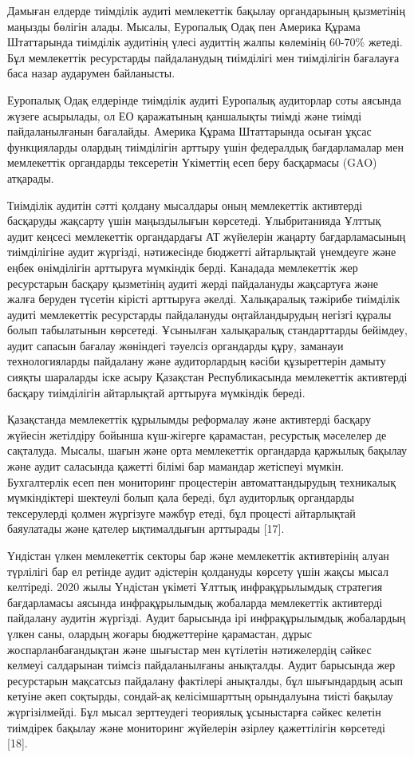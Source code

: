 \begin{multicols}{2}
Дамыған елдерде тиімділік аудиті мемлекеттік бақылау органдарының
қызметінің маңызды бөлігін алады. Мысалы, Еуропалық Одақ пен Америка
Құрама Штаттарында тиімділік аудитінің үлесі аудиттің жалпы көлемінің
60-70\% жетеді. Бұл мемлекеттік ресурстарды пайдаланудың тиімділігі мен
тиімділігін бағалауға баса назар аударумен байланысты.

Еуропалық Одақ елдерінде тиімділік аудиті Еуропалық аудиторлар соты
аясында жүзеге асырылады, ол ЕО қаражатының қаншалықты тиімді және
тиімді пайдаланылғанын бағалайды. Америка Құрама Штаттарында осыған
ұқсас функцияларды олардың тиімділігін арттыру үшін федералдық
бағдарламалар мен мемлекеттік органдарды тексеретін Үкіметтің есеп беру
басқармасы (GAO) атқарады.

Тиімділік аудитін сәтті қолдану мысалдары оның мемлекеттік активтерді
басқаруды жақсарту үшін маңыздылығын көрсетеді. Ұлыбританияда Ұлттық
аудит кеңсесі мемлекеттік органдардағы АТ жүйелерін жаңарту
бағдарламасының тиімділігіне аудит жүргізді, нәтижесінде бюджетті
айтарлықтай үнемдеуге және еңбек өнімділігін арттыруға мүмкіндік берді.
Канадада мемлекеттік жер ресурстарын басқару қызметінің аудиті жерді
пайдалануды жақсартуға және жалға беруден түсетін кірісті арттыруға
әкелді. Халықаралық тәжірибе тиімділік аудиті мемлекеттік ресурстарды
пайдалануды оңтайландырудың негізгі құралы болып табылатынын көрсетеді.
Ұсынылған халықаралық стандарттарды бейімдеу, аудит сапасын бағалау
жөніндегі тәуелсіз органдарды құру, заманауи технологияларды пайдалану
және аудиторлардың кәсіби құзыреттерін дамыту сияқты шараларды іске
асыру Қазақстан Республикасында мемлекеттік активтерді басқару
тиімділігін айтарлықтай арттыруға мүмкіндік береді.

Қазақстанда мемлекеттік құрылымды реформалау және активтерді басқару
жүйесін жетілдіру бойынша күш-жігерге қарамастан, ресурстық мәселелер де
сақталуда. Мысалы, шағын және орта мемлекеттік органдарда қаржылық
бақылау және аудит саласында қажетті білімі бар мамандар жетіспеуі
мүмкін. Бухгалтерлік есеп пен мониторинг процестерін автоматтандырудың
техникалық мүмкіндіктері шектеулі болып қала береді, бұл аудиторлық
органдарды тексерулерді қолмен жүргізуге мәжбүр етеді, бұл процесті
айтарлықтай баяулатады және қателер ықтималдығын арттырады {[}17{]}.

Үндістан үлкен мемлекеттік секторы бар және мемлекеттік активтерінің
алуан түрлілігі бар ел ретінде аудит әдістерін қолдануды көрсету үшін
жақсы мысал келтіреді. 2020 жылы Үндістан үкіметі Ұлттық инфрақұрылымдық
стратегия бағдарламасы аясында инфрақұрылымдық жобаларда мемлекеттік
активтерді пайдалану аудитін жүргізді. Аудит барысында ірі
инфрақұрылымдық жобалардың үлкен саны, олардың жоғары бюджеттеріне
қарамастан, дұрыс жоспарланбағандықтан және шығыстар мен күтілетін
нәтижелердің сәйкес келмеуі салдарынан тиімсіз пайдаланылғаны анықталды.
Аудит барысында жер ресурстарын мақсатсыз пайдалану фактілері анықталды,
бұл шығындардың асып кетуіне әкеп соқтырды, сондай-ақ келісімшарттың
орындалуына тиісті бақылау жүргізілмейді. Бұл мысал зерттеудегі
теориялық ұсыныстарға сәйкес келетін тиімдірек бақылау және мониторинг
жүйелерін әзірлеу қажеттілігін көрсетеді {[}18{]}.


\end{multicols}
